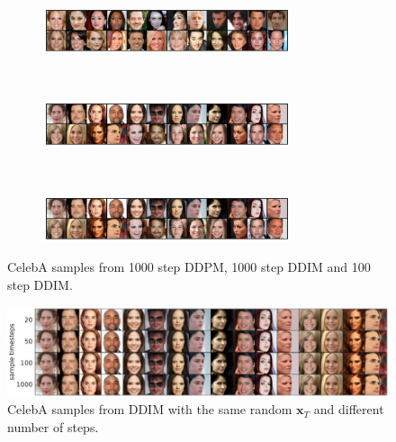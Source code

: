 \begin{figure}
    \centering
    \begin{subfigure}{\textwidth}
    \centering
    \includegraphics[width=0.8\textwidth]{figures/celeba-samples-uniform-1000-ddpm.pdf}
    \end{subfigure}
    ~
    \begin{subfigure}{\textwidth}
    \centering
    \includegraphics[width=0.8\textwidth]{figures/celeba-samples-uniform-1000-ddim.pdf}
    \end{subfigure}
    ~
    \begin{subfigure}{\textwidth}
    \centering
    \includegraphics[width=0.8\textwidth]{figures/celeba-samples-uniform-100-ddim.pdf}
    \end{subfigure}
    \caption{CelebA samples from 1000 step DDPM, 1000 step DDIM and 100 step DDIM.}
    \label{fig:celeba-samples}
\end{figure}

\begin{figure}
    \centering
    \includegraphics[width=\textwidth]{figures/celeba-consistency.pdf}
    \caption{CelebA samples from DDIM with the same random $\bm{x}_T$ and different number of steps.}
    \label{fig:celeba-consistency}
\end{figure}

